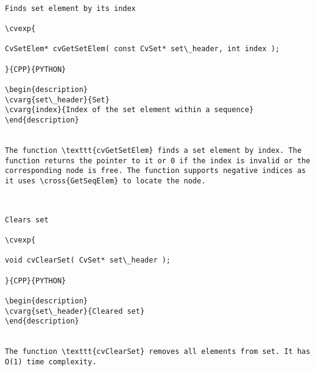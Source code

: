 \label{GetSetElem}
\begin{verbatim}

Finds set element by its index

\cvexp{

CvSetElem* cvGetSetElem( const CvSet* set\_header, int index );

}{CPP}{PYTHON}

\begin{description}
\cvarg{set\_header}{Set}
\cvarg{index}{Index of the set element within a sequence}
\end{description}


The function \texttt{cvGetSetElem} finds a set element by index. The function returns the pointer to it or 0 if the index is invalid or the corresponding node is free. The function supports negative indices as it uses \cross{GetSeqElem} to locate the node.


\end{verbatim}
\label{ClearSet}
\begin{verbatim}

Clears set

\cvexp{

void cvClearSet( CvSet* set\_header );

}{CPP}{PYTHON}

\begin{description}
\cvarg{set\_header}{Cleared set}
\end{description}


The function \texttt{cvClearSet} removes all elements from set. It has O(1) time complexity.


\end{verbatim}
